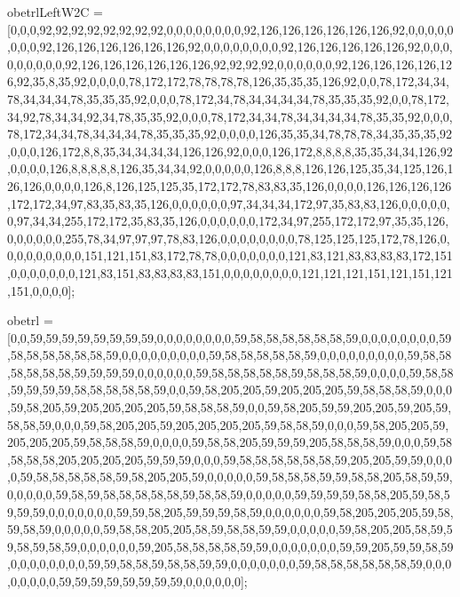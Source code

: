 obetrlLeftW2C = [0,0,0,92,92,92,92,92,92,92,92,0,0,0,0,0,0,0,0,92,126,126,126,126,126,126,92,0,0,0,0,0,0,0,0,92,126,126,126,126,126,126,92,0,0,0,0,0,0,0,0,92,126,126,126,126,126,92,0,0,0,0,0,0,0,0,0,92,126,126,126,126,126,126,92,92,92,92,0,0,0,0,0,0,92,126,126,126,126,126,92,35,8,35,92,0,0,0,0,78,172,172,78,78,78,78,126,35,35,35,126,92,0,0,78,172,34,34,78,34,34,34,78,35,35,35,92,0,0,0,78,172,34,78,34,34,34,34,78,35,35,35,92,0,0,78,172,34,92,78,34,34,92,34,78,35,35,92,0,0,0,78,172,34,34,78,34,34,34,34,78,35,35,92,0,0,0,78,172,34,34,78,34,34,34,78,35,35,35,92,0,0,0,0,126,35,35,34,78,78,78,34,35,35,35,92,0,0,0,126,172,8,8,35,34,34,34,34,126,126,92,0,0,0,126,172,8,8,8,8,35,35,34,34,126,92,0,0,0,0,126,8,8,8,8,8,126,35,34,34,92,0,0,0,0,0,126,8,8,8,126,126,125,35,34,125,126,126,126,0,0,0,0,126,8,126,125,125,35,172,172,78,83,83,35,126,0,0,0,0,126,126,126,126,172,172,34,97,83,35,83,35,126,0,0,0,0,0,0,97,34,34,34,172,97,35,83,83,126,0,0,0,0,0,0,97,34,34,255,172,172,35,83,35,126,0,0,0,0,0,0,172,34,97,255,172,172,97,35,35,126,0,0,0,0,0,0,255,78,34,97,97,97,78,83,126,0,0,0,0,0,0,0,0,78,125,125,125,172,78,126,0,0,0,0,0,0,0,0,0,151,121,151,83,172,78,78,0,0,0,0,0,0,0,121,83,121,83,83,83,83,172,151,0,0,0,0,0,0,0,121,83,151,83,83,83,83,151,0,0,0,0,0,0,0,0,121,121,121,151,121,151,121,151,0,0,0,0];

obetrl = [0,0,59,59,59,59,59,59,59,59,0,0,0,0,0,0,0,0,59,58,58,58,58,58,58,59,0,0,0,0,0,0,0,0,59,58,58,58,58,58,58,59,0,0,0,0,0,0,0,0,0,59,58,58,58,58,58,59,0,0,0,0,0,0,0,0,0,59,58,58,58,58,58,58,59,59,59,59,0,0,0,0,0,0,59,58,58,58,58,58,59,58,58,58,59,0,0,0,0,59,58,58,59,59,59,59,58,58,58,58,58,59,0,0,59,58,205,205,59,205,205,205,59,58,58,58,59,0,0,0,59,58,205,59,205,205,205,205,59,58,58,58,59,0,0,59,58,205,59,59,205,205,59,205,59,58,58,59,0,0,0,59,58,205,205,59,205,205,205,205,59,58,58,59,0,0,0,59,58,205,205,59,205,205,205,59,58,58,58,59,0,0,0,0,59,58,58,205,59,59,59,205,58,58,58,59,0,0,0,59,58,58,58,58,205,205,205,205,59,59,59,0,0,0,59,58,58,58,58,58,58,59,205,205,59,59,0,0,0,0,59,58,58,58,58,58,59,58,205,205,59,0,0,0,0,0,59,58,58,58,59,59,58,58,205,58,59,59,0,0,0,0,0,59,58,59,58,58,58,58,58,59,58,58,59,0,0,0,0,0,59,59,59,59,58,58,205,59,58,59,59,59,0,0,0,0,0,0,0,59,59,58,205,59,59,59,58,59,0,0,0,0,0,0,59,58,205,205,205,59,58,59,58,59,0,0,0,0,0,59,58,58,205,205,58,59,58,58,59,59,0,0,0,0,0,59,58,205,205,58,59,59,58,59,58,59,0,0,0,0,0,0,59,205,58,58,58,58,59,59,0,0,0,0,0,0,0,59,59,205,59,59,58,59,0,0,0,0,0,0,0,0,59,59,58,58,59,58,58,59,59,0,0,0,0,0,0,0,59,58,58,58,58,58,58,59,0,0,0,0,0,0,0,0,59,59,59,59,59,59,59,59,0,0,0,0,0,0];


